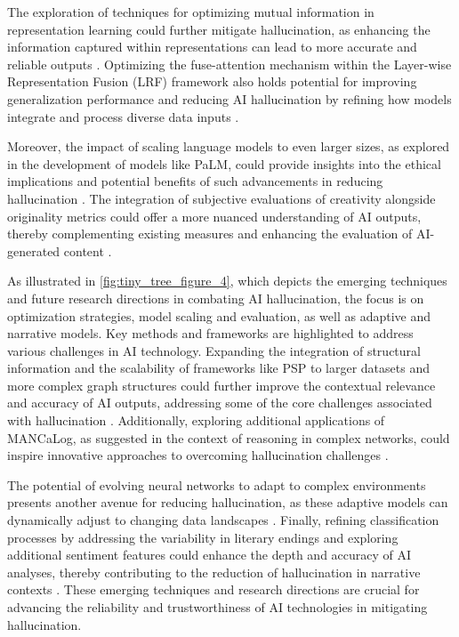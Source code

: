 The exploration of techniques for optimizing mutual information in representation learning could further mitigate hallucination, as enhancing the information captured within representations can lead to more accurate and reliable outputs \cite{wang2022rethinkingminimalsufficientrepresentation}. Optimizing the fuse-attention mechanism within the Layer-wise Representation Fusion (LRF) framework also holds potential for improving generalization performance and reducing AI hallucination by refining how models integrate and process diverse data inputs \cite{zheng2023layerwiserepresentationfusioncompositional}.

Moreover, the impact of scaling language models to even larger sizes, as explored in the development of models like PaLM, could provide insights into the ethical implications and potential benefits of such advancements in reducing hallucination \cite{chowdhery2023palm}. The integration of subjective evaluations of creativity alongside originality metrics could offer a more nuanced understanding of AI outputs, thereby complementing existing measures and enhancing the evaluation of AI-generated content \cite{palmini2024patternscreativityuserinput}.

As illustrated in \autoref{fig:tiny_tree_figure_4}, which depicts the emerging techniques and future research directions in combating AI hallucination, the focus is on optimization strategies, model scaling and evaluation, as well as adaptive and narrative models. Key methods and frameworks are highlighted to address various challenges in AI technology. Expanding the integration of structural information and the scalability of frameworks like PSP to larger datasets and more complex graph structures could further improve the contextual relevance and accuracy of AI outputs, addressing some of the core challenges associated with hallucination \cite{ge2024psppretrainingstructureprompt}. Additionally, exploring additional applications of MANCaLog, as suggested in the context of reasoning in complex networks, could inspire innovative approaches to overcoming hallucination challenges \cite{shakarian2022reasoningcomplexnetworkslogic}.

The potential of evolving neural networks to adapt to complex environments presents another avenue for reducing hallucination, as these adaptive models can dynamically adjust to changing data landscapes \cite{le2019evolvingselfsupervisedneuralnetworks}. Finally, refining classification processes by addressing the variability in literary endings and exploring additional sentiment features could enhance the depth and accuracy of AI analyses, thereby contributing to the reduction of hallucination in narrative contexts \cite{jannidis2016analyzingfeaturesdetectionhappy}. These emerging techniques and research directions are crucial for advancing the reliability and trustworthiness of AI technologies in mitigating hallucination.

